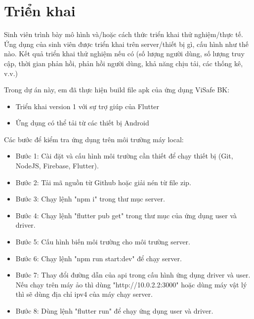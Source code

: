 \documentclass[../DoAn.tex]{subfiles}
\begin{document}
\section{Triển khai}
Sinh viên trình bày mô hình và/hoặc cách thức triển khai thử nghiệm/thực tế. Ứng dụng của sinh viên được triển khai trên server/thiết bị gì, cấu hình như thế nào. Kết quả triển khai thử nghiệm nếu có (số lượng người dùng, số lượng truy cập, thời gian phản hồi, phản hồi người dùng, khả năng chịu tải, các thống kê, v.v.)

Trong dự án này, em đã thực hiện build file apk của ứng dụng ViSafe BK:
\begin{itemize}
    \item Triển khai version 1 với sự trợ giúp của Flutter
    \item Ứng dụng có thể tải từ các thiết bị Android
\end{itemize}
Các bước để kiểm tra ứng dụng trên môi trường máy local:
\begin{itemize}
    \item Bước 1: Cài đặt và cấu hình môi trường cần thiết để chạy thiết bị (Git, NodeJS, Firebase, Flutter).
    \item Bước 2: Tải mã nguồn từ Github hoặc giải nén từ file zip.
    \item Bước 3: Chạy lệnh "npm i" trong thư mục server.
    \item Bước 4: Chạy lệnh "flutter pub get" trong thư mục của ứng dụng user và driver.
    \item Bước 5: Cấu hình biến môi trường cho môi trường server.
    \item Bước 6: Chạy lệnh "npm run start:dev" để chạy server.
    \item Bước 7: Thay đổi đường dẫn của api trong cấu hình ứng dụng driver và user. Nếu chạy trên máy ảo thì dùng "http://10.0.2.2:3000" hoặc dùng máy vật lý thì sẽ dùng địa chỉ ipv4 của máy chạy server.
    \item Bước 8: Dùng lệnh "flutter run" để chạy ứng dụng user và driver.
\end{itemize}
\end{document}
